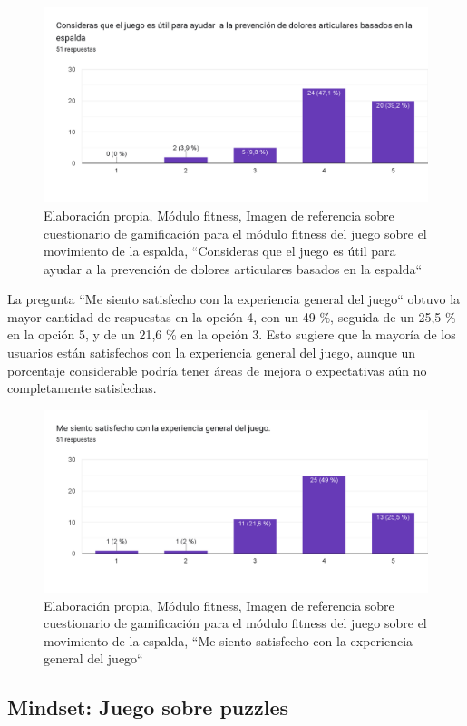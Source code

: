 \begin{figure}[H]
  \centering
  \includegraphics[width=0.7\linewidth]{Imagenes/fd11.png}
  \caption{Elaboración propia, Módulo fitness, Imagen de referencia sobre cuestionario de gamificación para el módulo fitness del juego sobre el movimiento de la espalda, ``Consideras que el juego es útil para ayudar a la prevención de dolores articulares basados en la espalda``}
  \label{fig:cuestionario22fitness}
\end{figure}


La pregunta ``Me siento satisfecho con la experiencia general del juego`` obtuvo la mayor cantidad de respuestas en la opción 4, con un 49 \%, seguida de un 25,5 \% en la opción 5, y de un 21,6 \% en la opción 3. Esto sugiere que la mayoría de los usuarios están satisfechos con la experiencia general del juego, aunque un porcentaje considerable podría tener áreas de mejora o expectativas aún no completamente satisfechas.

\begin{figure}[H]
  \centering
  \includegraphics[width=0.7\linewidth]{Imagenes/fd12.png}
  \caption{Elaboración propia, Módulo fitness, Imagen de referencia sobre cuestionario de gamificación para el módulo fitness del juego sobre el movimiento de la espalda, ``Me siento satisfecho con la experiencia general del juego``}
  \label{fig:cuestionario23fitness}
\end{figure}




\subsection{Mindset: Juego sobre puzzles}

